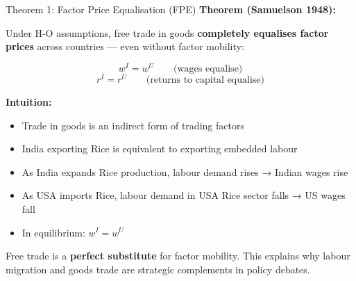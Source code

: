 \documentclass[
  ignorenonframetext,
  aspectratio=169,
]{beamer}
\makeatletter
\providecommand{\tightlist}{%
  \setlength{\itemsep}{0pt}\setlength{\parskip}{0pt}}
\let\quarto@originallabel\label
\DeclareRobustCommand*{\label}[1]{\quarto@originallabel{#1}}
\makeatother
\begin{document}
\begin{frame}{Theorem 1: Factor Price Equalisation (FPE)}
\label{theorem-1-factor-price-equalisation-fpe}
\textbf{Theorem (Samuelson 1948):}

Under H-O assumptions, free trade in goods \textbf{completely equalises
factor prices} across countries --- even without factor mobility:

\[w^I = w^U \qquad \text{(wages equalise)}\]
\[r^I = r^U \qquad \text{(returns to capital equalise)}\]

\textbf{Intuition:}

\begin{itemize}
\tightlist
\item
  Trade in goods is an indirect form of trading factors
\item
  India exporting Rice is equivalent to exporting embedded labour
\item
  As India expands Rice production, labour demand rises → Indian wages
  rise
\item
  As USA imports Rice, labour demand in USA Rice sector falls → US wages
  fall
\item
  In equilibrium: \(w^I = w^U\)
\end{itemize}

\begin{tcolorbox}[enhanced jigsaw, colframe=quarto-callout-important-color-frame, coltitle=black, bottomrule=.15mm, bottomtitle=1mm, breakable, colbacktitle=quarto-callout-important-color!10!white, titlerule=0mm, leftrule=.75mm, left=2mm, toptitle=1mm, title=\textcolor{quarto-callout-important-color}{\faExclamation}\hspace{0.5em}{The FPE insight}, arc=.35mm, rightrule=.15mm, toprule=.15mm, colback=white, opacitybacktitle=0.6, opacityback=0]

Free trade is a \textbf{perfect substitute} for factor mobility. This
explains why labour migration and goods trade are strategic complements
in policy debates.

\end{tcolorbox}
\end{frame}
\end{document}
